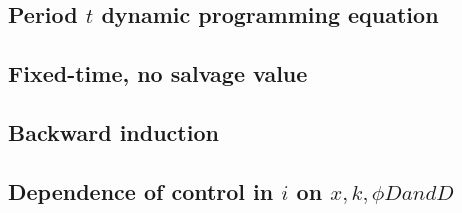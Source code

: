 \documentclass[]{article}
\begin{document}
\subsection{\texorpdfstring{Period \(t\) dynamic programming
equation}{Period t dynamic programming equation}}\label{period-t-dynamic-programming-equation}

\subsection{Fixed-time, no salvage
value}\label{fixed-time-no-salvage-value}

\subsection{Backward induction}\label{backward-induction}

\subsection{\texorpdfstring{Dependence of control in \(i\) on
\(x, k, \phi D and D\)}{Dependence of control in i on x, k, \textbackslash{}phi D and D}}\label{dependence-of-control-in-i-on-x-k-phi-d-and-d}
\end{document}

